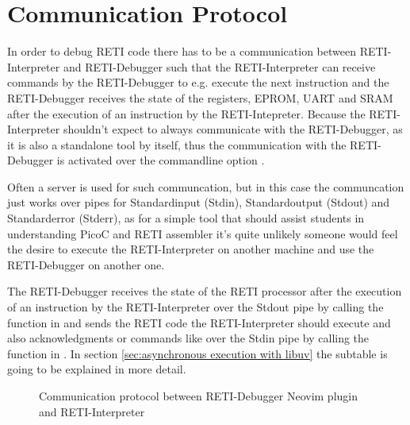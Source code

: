 \documentclass{report}
\begin{document}

\section{Communication Protocol}
\label{sec:communication protocol}


\sloppy

In order to debug RETI code there has to be a communication between RETI-Interpreter and RETI-Debugger such that the RETI-Interpreter can receive commands by the RETI-Debugger to e.g. execute the next instruction and the RETI-Debugger receives the state of the registers, EPROM, UART and SRAM after the execution of an instruction by the RETI-Intepreter. Because the RETI-Interpreter shouldn't expect to always communicate with the RETI-Debugger, as it is also a standalone tool by itself, thus the communication with the RETI-Debugger is activated over the commandline option .

Often a server is used for such communcation, but in this case the communcation just works over \alert{pipes} for Standardinput (\alert{Stdin}), Standardoutput (\alert{Stdout}) and Standarderror (\alert{Stderr}), as for a simple tool that should assist students in understanding PicoC and RETI assembler it's quite unlikely someone would feel the desire to execute the RETI-Interpreter on another machine and use the RETI-Debugger on another one.

The RETI-Debugger receives the state of the RETI processor after the execution of an instruction by the RETI-Interpreter over the Stdout pipe by calling the  function in  and sends the RETI code the RETI-Interpreter should execute and also acknowledgments or commands like  over the Stdin pipe by calling the  function in . In section \ref{sec:asynchronous execution with libuv}  the subtable  is going to be explained in more detail.

\begin{figure}
	\centering
	\caption{Communication protocol between RETI-Debugger Neovim plugin and RETI-Interpreter}
	\label{fig:communication reti debugger and reti interpreter}
  \vspace{-0.5cm}
\end{figure}
\end{document}
